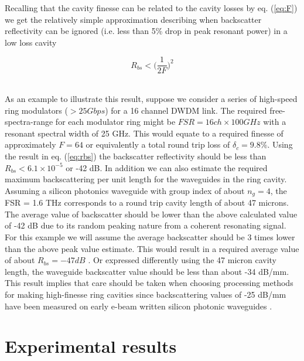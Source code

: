 \documentclass[10pt]{article}
\begin{document}
\noindent
Recalling that the cavity finesse can be related to the cavity losses by  eq. (\ref{eq:F}) we get the relatively simple approximation describing  when backscatter reflectivity can be ignored (i.e. less than 5\% drop in peak resonant power) in a low loss cavity

\begin{equation}
R_{bs} < \Big(\frac{1}{2F}\Big)^2
\label{eq:rbs}
\end{equation}
~


As an example to illustrate this result, suppose we consider a series of high-speed ring modulators ($ > 25  Gbps$) for a 16 channel DWDM link.  The required free-spectra-range for each modulator ring might be $ FSR = 16ch \times{100GHz}$ with a resonant spectral width of 25 GHz.  This would equate to a required finesse of approximately  $ F = 64 $   or equivalently a total round trip loss of $ \delta_c = 9.8\% $.  Using the result in eq. (\ref{eq:rbs}) the backscatter reflectivity should be less than $ R_{bs} < 6.1 \times 10^{-5}  $ or -42 dB.  In addition we can also estimate the required maximum backscattering per unit length for the waveguides in the ring cavity. Assuming a silicon photonics waveguide with group index of about $n_g=4$, the FSR = 1.6 THz corresponds to a round trip cavity length of about 47 microns. The average value of backscatter should be lower than the above calculated value of -42 dB due to its  random peaking nature from a coherent resonating signal.   For this example we will assume the average backscatter should be 3 times lower than the above peak value estimate.  This would result in a required average value of about $ R_{bs}  = -47 dB  $ .  Or expressed differently using the 47 micron cavity length, the waveguide backscatter value should be less than about -34 dB/mm.  This result implies that care should be taken when choosing processing methods for making high-finesse ring cavities since backscattering values of -25 dB/mm have been measured on early e-beam written silicon photonic waveguides \cite{Melati2014a}. 



\section{Experimental results}
\end{document}
